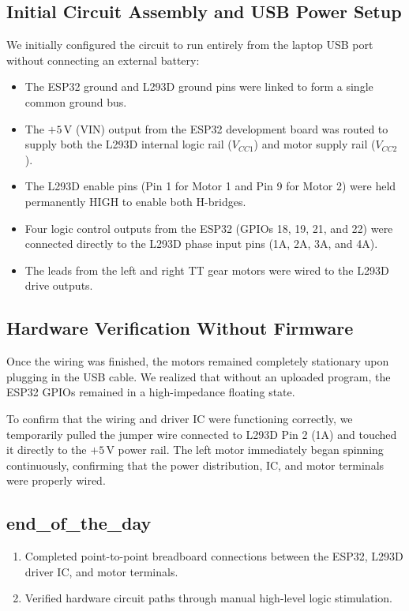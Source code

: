 \documentclass[11pt,a4paper]{article}
\begin{document}
\subsection*{Initial Circuit Assembly and USB Power Setup}
We initially configured the circuit to run entirely from the laptop USB port without connecting an external battery:
\begin{itemize}
    \item The ESP32 ground and L293D ground pins were linked to form a single common ground bus.
    \item The $+5\,\text{V}$ (VIN) output from the ESP32 development board was routed to supply both the L293D internal logic rail ($V_{CC1}$) and motor supply rail ($V_{CC2}$).
    \item The L293D enable pins (Pin 1 for Motor 1 and Pin 9 for Motor 2) were held permanently HIGH to enable both H-bridges.
    \item Four logic control outputs from the ESP32 (GPIOs 18, 19, 21, and 22) were connected directly to the L293D phase input pins (1A, 2A, 3A, and 4A).
    \item The leads from the left and right TT gear motors were wired to the L293D drive outputs.
\end{itemize}

\subsection*{Hardware Verification Without Firmware}
Once the wiring was finished, the motors remained completely stationary upon plugging in the USB cable. We realized that without an uploaded program, the ESP32 GPIOs remained in a high-impedance floating state. 

To confirm that the wiring and driver IC were functioning correctly, we temporarily pulled the jumper wire connected to L293D Pin 2 (1A) and touched it directly to the $+5\,\text{V}$ power rail. The left motor immediately began spinning continuously, confirming that the power distribution, IC, and motor terminals were properly wired.

\subsection{end\_of\_the\_day}
\begin{enumerate}
    \item Completed point-to-point breadboard connections between the ESP32, L293D driver IC, and motor terminals.
    \item Verified hardware circuit paths through manual high-level logic stimulation.
\end{enumerate}
\end{document}

